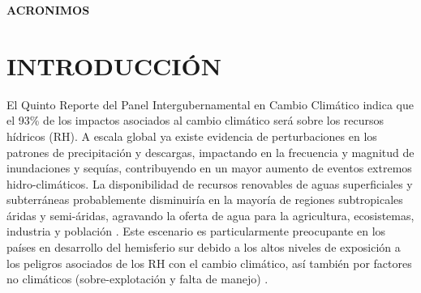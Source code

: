 \documentclass[12pt]{article}
\begin{document}
	

\clearpage

\tableofcontents
\clearpage
\listoffigures
\clearpage
\listoftables
\clearpage
\listofappendices
\clearpage

\begin{center}
\large{\textbf {ACRONIMOS}}
\end{center}
\blindtext

\clearpage






\clearpage
\vspace*{0.5mm}
\section{INTRODUCCIÓN}


El Quinto Reporte del Panel Intergubernamental en Cambio Climático \citep{Field2014} indica que el 93\% de los impactos asociados al cambio climático será sobre los recursos hídricos (RH). A escala global ya existe evidencia de perturbaciones en los patrones de precipitación y descargas, impactando en la frecuencia y magnitud de inundaciones y sequías, contribuyendo en un mayor aumento de eventos extremos hidro-climáticos. La disponibilidad de recursos renovables de aguas superficiales y subterráneas probablemente disminuiría en la mayoría de regiones subtropicales áridas y semi-áridas, agravando la oferta de agua para la agricultura, ecosistemas, industria y población \citep{Field2014}. Este escenario es particularmente preocupante en los países en desarrollo del hemisferio sur \citep{Satterthwaite2012} debido a los altos niveles de exposición a los peligros asociados de los RH con el cambio climático, así también por factores no climáticos (sobre-explotación y falta de manejo) \citep{MacAlister2018}.
\end{document}
